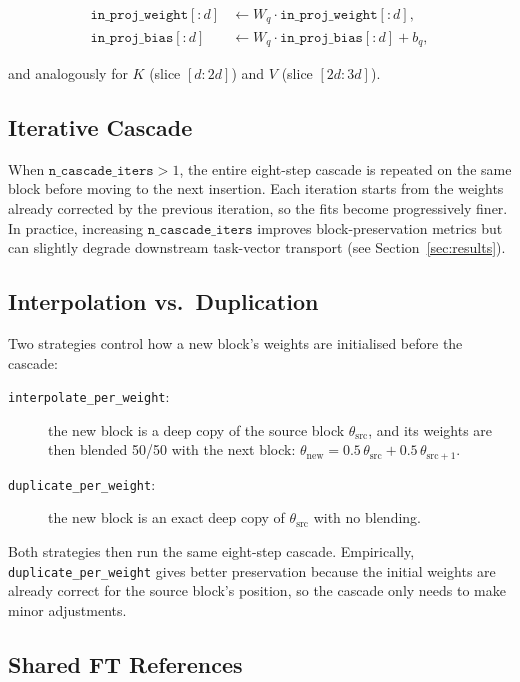 \documentclass[11pt,a4paper]{article}
\begin{document}
\begin{align}
    \texttt{in\_proj\_weight}[:d] &\gets W_q \cdot \texttt{in\_proj\_weight}[:d], \\
    \texttt{in\_proj\_bias}[:d]   &\gets W_q \cdot \texttt{in\_proj\_bias}[:d] + b_q,
\end{align}

and analogously for $K$ (slice $[d:2d]$) and $V$ (slice $[2d:3d]$).

\subsection{Iterative Cascade}
\label{subsec:iterative}

When $\texttt{n\_cascade\_iters} > 1$, the entire eight-step cascade is
repeated on the same block before moving to the next insertion. Each
iteration starts from the weights already corrected by the previous
iteration, so the fits become progressively finer. In practice, increasing
$\texttt{n\_cascade\_iters}$ improves block-preservation metrics but can
slightly degrade downstream task-vector transport (see
Section~\ref{sec:results}).

\subsection{Interpolation vs.\ Duplication}
\label{subsec:interp_vs_dupl}

Two strategies control how a new block's weights are initialised before the
cascade:

\begin{description}
    \item[\texttt{interpolate\_per\_weight}:] the new block is a deep copy of
          the source block $\theta_{\text{src}}$, and its weights are then
          blended 50/50 with the next block:
          $\theta_{\text{new}} = 0.5\,\theta_{\text{src}} + 0.5\,\theta_{\text{src}+1}$.
    \item[\texttt{duplicate\_per\_weight}:] the new block is an exact deep
          copy of $\theta_{\text{src}}$ with no blending.
\end{description}

Both strategies then run the same eight-step cascade. Empirically,
\texttt{duplicate\_per\_weight} gives better preservation because the initial
weights are already correct for the source block's position, so the cascade
only needs to make minor adjustments.

\subsection{Shared FT References}
\label{subsec:share_ft}
\end{document}
